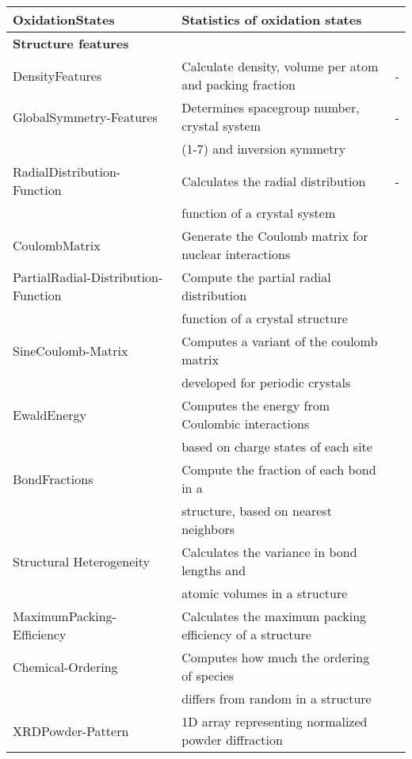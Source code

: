 \begin{center}
\begin{longtable}{M{3.5cm} M{6.5cm} M{2.0cm}}
  OxidationStates & Statistics of oxidation states & \cite{Deml2016}  \\   
\hline 
  \textbf{Structure features} & & \\   
  DensityFeatures & Calculate density, volume per atom and packing fraction & - \\   
  GlobalSymmetry-Features & Determines spacegroup number, crystal system  & - \\   
   & (1-7) and inversion symmetry & \\ 
  RadialDistribution-Function & Calculates the radial distribution  & - \\   
   & function of a crystal system & \\ 
  CoulombMatrix & Generate the Coulomb matrix for nuclear interactions  & \cite{Rupp2012}  \\    
  PartialRadial-Distribution-Function & Compute the partial radial distribution  & \cite{Schuett2014}  \\   
   & function of a crystal structure & \\ 
  SineCoulomb-Matrix & Computes a variant of the coulomb matrix & \cite{Faber2015}  \\   
   & developed for periodic crystals & \\ 
  EwaldEnergy & Computes the energy from Coulombic interactions  & \cite{Ewald1921}  \\   
   & based on charge states of each site & \\ 
  BondFractions & Compute the fraction of each bond in a  & \cite{Hansen2015}  \\   
   & structure, based on nearest neighbors & \\ 
  Structural Heterogeneity & Calculates the variance in bond lengths and  & \cite{Ward2017}  \\   
   & atomic volumes in a structure & \\ 
  MaximumPacking-Efficiency & Calculates the maximum packing efficiency of a structure & \cite{Ward2017} \\   
  Chemical-Ordering & Computes how much the ordering of species  & \cite{Ward2017}  \\   
   & differs from random in a structure & \\ 
  XRDPowder-Pattern & 1D array representing normalized powder diffraction & \cite{Ong2013} \\ 

\end{longtable}
\end{center}
